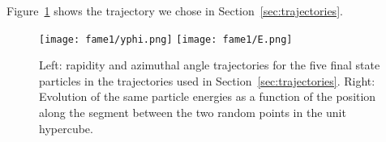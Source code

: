 \documentclass[main.tex]{subfiles}
\begin{document}
Figure~\ref{fig:detectorpath} shows the trajectory we chose in Section~\ref{sec:trajectories}.

\begin{figure}
    \centering
    \texttt{[image: fame1/yphi.png]}
    \texttt{[image: fame1/E.png]}
    \caption{Left: rapidity and azimuthal angle trajectories for the five final state particles in the trajectories used in Section~\ref{sec:trajectories}.
    Right: Evolution of the same particle energies as a function of the position along the segment between the two random points in the unit hypercube.
    }
    \label{fig:detectorpath}
\end{figure}
\end{document}
